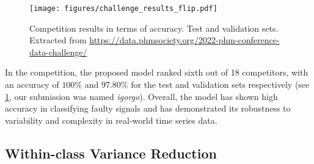 \begin{figure}[!htb]
    \begin{center}
    \centerline{\texttt{[image: figures/challenge\_results\_flip.pdf]}}
    \captionsetup{justification=raggedright}
    \caption{Competition results in terms of accuracy. Test and validation sets. Extracted from \small \url{https://data.phmsociety.org/2022-phm-conference-data-challenge/}}
    \label{fig:phm_results}
    \end{center}
\end{figure}


In the competition, the proposed model ranked sixth out of 18 competitors, with an accuracy of $100\%$ and $97.80\%$ for the test and validation sets respectively (see \cref{fig:phm_results}, our submission was named \textit{igorgo}). Overall, the model has shown high accuracy in classifying faulty signals and has demonstrated its robustness to variability and complexity in real-world time series data.


\subsection{Within-class Variance Reduction}

